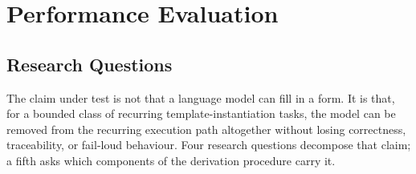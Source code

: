 \chapter{Performance Evaluation}
\label{ch:evaluation}

%

\section{Research Questions}
\label{sec:eval:rq}

The claim under test is not that a language model can fill in a form. It is that, for a
bounded class of recurring template-instantiation tasks, the model can be removed from the
recurring execution path altogether without losing correctness, traceability, or fail-loud
behaviour. Four research questions decompose that claim; a fifth asks which components of
the derivation procedure carry it.

